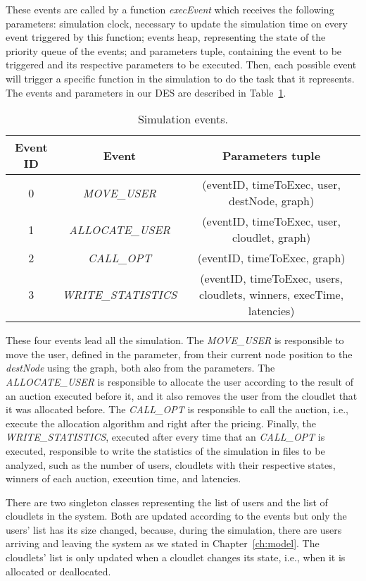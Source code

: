 \documentclass[English]{ic-tese-v3}
\begin{document}
These events are called by a function \emph{execEvent} which receives the following parameters: simulation clock, necessary to update the simulation time on every event triggered by this function; events heap, representing the state of the priority queue of the events; and parameters tuple, containing the event to be triggered and its respective parameters to be executed. Then, each possible event will trigger a specific function in the simulation to do the task that it represents. The events and parameters in our DES are described in Table~\ref{tab:events}.
\begin{table}[b]
\scriptsize
\centering
\begin{tabular}{ccc}
\toprule
\textbf{Event ID} & \textbf{Event}   & \textbf{Parameters tuple}                              \\
\midrule
0                 & \emph{MOVE\_USER}        & (eventID, timeToExec, user, destNode, graph)                          \\
1                 & \emph{ALLOCATE\_USER}    & (eventID, timeToExec, user, cloudlet, graph)                          \\
2                 & \emph{CALL\_OPT}         & (eventID, timeToExec, graph)                                          \\
3                 & \emph{WRITE\_STATISTICS} & (eventID, timeToExec, users, cloudlets, winners, execTime, latencies) \\ \bottomrule     
\end{tabular}
\caption{\label{tab:events}Simulation events.}
\end{table}
These four events lead all the simulation. The \emph{MOVE\_USER} is responsible to move the user, defined in the parameter, from their current node position to the \emph{destNode} using the graph, both also from the parameters. The \emph{ALLOCATE\_USER} is responsible to allocate the user according to the result of an auction executed before it, and it also removes the user from the cloudlet that it was allocated before. The \emph{CALL\_OPT} is responsible to call the auction, i.e., execute the allocation algorithm and right after the pricing. Finally, the \emph{WRITE\_STATISTICS}, executed after every time that an \emph{CALL\_OPT} is executed, responsible to write the statistics of the simulation in files to be analyzed, such as the number of users, cloudlets with their respective states, winners of each auction, execution time, and latencies.

There are two singleton classes representing the list of users and the list of cloudlets in the system. Both are updated according to the events but only the users' list has its size changed, because, during the simulation, there are users arriving and leaving the system as we stated in Chapter~\ref{ch:model}. The cloudlets' list is only updated when a cloudlet changes its state, i.e., when it is allocated or deallocated.
\end{document}
